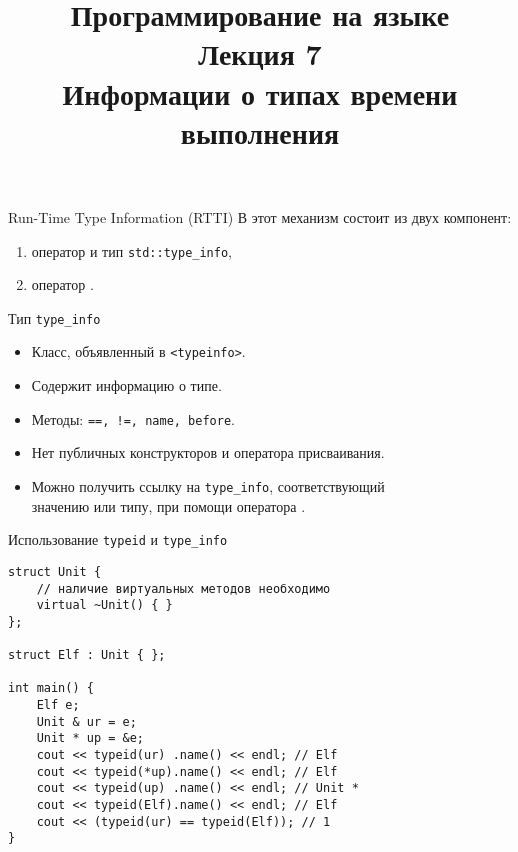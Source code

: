 \documentclass[aspectration=1610,t]{beamer}
\title{{\bf Программирование на языке \langcpp\protect\\Лекция
7\protect\vspace{1em}\\}Информации о типах времени выполнения}
\begin{document}
\begin{frame} 
  \titlepage
\end{frame}

\begin{frame}[fragile]{Run-Time Type Information (RTTI)}
В \langcpp этот механизм состоит из двух компонент:
\begin{enumerate}
    \item оператор  и тип \texttt{std::type\_info},
    \item оператор .
\end{enumerate}
\pause
\begin{block}{Тип {\tt type\_info}}
    \begin{itemize}
        \item Класс, объявленный в \texttt{<typeinfo>}.
        \item Содержит информацию о типе.
        \item Методы: \texttt{==, !=, name, before}.
        \item Нет публичных конструкторов и оператора присваивания.
        \item Можно получить ссылку на \texttt{type\_info}, соответствующий\\ значению или типу, при помощи оператора .
    \end{itemize}
\end{block}
\end{frame}

\begin{frame}[fragile]{Использование \texttt{typeid} и {\tt type\_info}}
    \begin{lstlisting}
struct Unit { 
    // наличие виртуальных методов необходимо
    virtual ~Unit() { } 
}; 

struct Elf : Unit { };

int main() {
    Elf e;
    Unit & ur = e;
    Unit * up = &e;
    cout << typeid(ur) .name() << endl; // Elf
    cout << typeid(*up).name() << endl; // Elf
    cout << typeid(up) .name() << endl; // Unit *
    cout << typeid(Elf).name() << endl; // Elf
    cout << (typeid(ur) == typeid(Elf)); // 1
}
    \end{lstlisting}
\end{frame}
\end{document}
